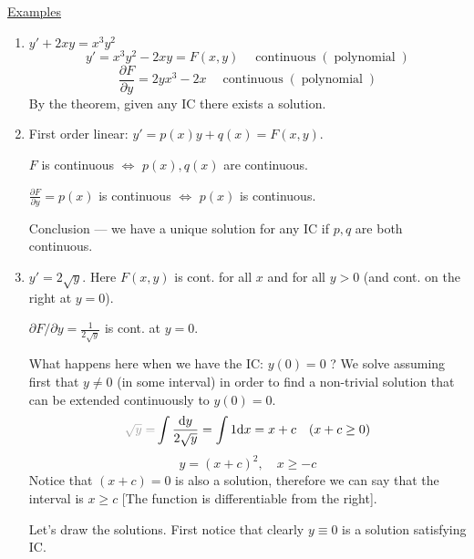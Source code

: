 \documentclass{article}
\newcommand{\mathd}{\mathrm{d}}
\newcommand{\tmop}[1]{\ensuremath{\operatorname{#1}}}
\newcommand{\tmtextbf}[1]{\text{{\bfseries{#1}}}}
\begin{document}
\begin{center}
\end{center}

{\underline{Examples}}
\begin{enumerate}
  \item $y' + 2 xy = x^3 y^2$
  \[ y' = x^3 y^2 - 2 xy = F (x, y) \quad \tmop{continuous}
     (\tmop{polynomial}) \]
  \[ \frac{\partial F}{\partial y} = 2 yx^3 - 2 x \quad \tmop{continuous}
     (\tmop{polynomial}) \]
  By the theorem, given any IC there exists a solution.
  
  \item First order linear: $y' = p (x) y + q (x) = F (x, y)$.
  
  $F$ is continuous $\Longleftrightarrow$ $p (x), q (x)$ are continuous.
  
  $\frac{\partial F}{\partial y} = p (x)$ is continuous $\Longleftrightarrow$
  $p (x)$ is continuous.
  
  Conclusion --- we have a unique solution for any IC if $p, q$ are both
  continuous.
  
  \item $y' = 2 \sqrt{y}$. Here $F (x, y)$ is cont. for all $x$ and for all $y
  > 0$ (and cont. on the right at $y = 0$).
  
  $\partial F / \partial y = \frac{1}{2 \sqrt{y}}$ is \tmtextbf{not} cont. at
  $y = 0$.
  
  What happens here when we have the IC: $y (0) = 0$ ? We solve assuming first
  that $y \neq 0$ (in some interval) in order to find a non-trivial solution
  that can be extended continuously to $y (0) = 0$.
  \[ {\color[HTML]{A0A0A0}\sqrt{y} =} \int \frac{\mathd y}{2 \sqrt{y}} = \int
     1 \mathd x = x + c \quad (x + c \geq 0) \]
  \[ y = (x + c)^2, \quad x \geq - c \]
  Notice that $(x + c) = 0$ is also a solution, therefore we can say that the
  interval is $x \geq c$ [The function is differentiable from the right].
  
  Let's draw the solutions. First notice that clearly $y \equiv 0$ is a
  solution satisfying IC.
  
  \begin{center}
  \end{center}
  

\end{enumerate}
\end{document}
